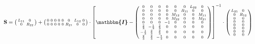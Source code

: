 \[ \mathbf{S} = \left(\begin{smallmatrix} L_{11} & 0 \\ 0 & R_{22}
\end{smallmatrix}\right) + \left(\begin{smallmatrix} 0 & 0 & 0 & 0 & 0
& 0 & L_{12} & 0 \\ 0 & 0 & 0 & 0 & 0 & R_{21} & 0 & 0
\end{smallmatrix}\right) \cdot \left[ \boldsymbol{\mathbbm{I}}  -
\left(\begin{smallmatrix} 0 & 0 & 0 & 0 & 0 & 0 & L_{22} & 0 \\ 0 & 0
& 0 & 0 & 0 & R_{11} & 0 & 0 \\ 0 & 0 & 0 & 0 & M_{12} & 0 & 0 &
M_{11} \\ 0 & 0 & 0 & 0 & M_{22} & 0 & 0 & M_{21} \\ 0 & 0 & 0 & -1 &
0 & 0 & 0 & 0 \\ \frac{2}{3} & -\frac{1}{3} & \frac{2}{3} & 0 & 0 & 0
& 0 & 0 \\ -\frac{1}{3} & \frac{2}{3} & \frac{2}{3} & 0 & 0 & 0 & 0 &
0 \\ \frac{2}{3} & \frac{2}{3} & -\frac{1}{3} & 0 & 0 & 0 & 0 & 0
\end{smallmatrix}\right) \right]^{-1} \cdot\left(\begin{smallmatrix}
L_{21} & 0 \\ 0 & R_{12} \\ 0 & 0 \\ 0 & 0 \\ 0 & 0 \\ 0 & 0 \\ 0 & 0
\\ 0 & 0 \end{smallmatrix}\right) \]
